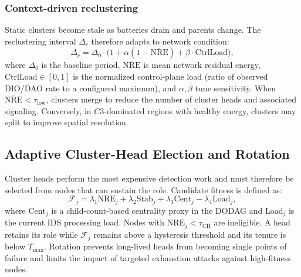 \subsubsection{Context-driven reclustering}
Static clusters become stale as batteries drain and parents change.
The reclustering interval $\Delta_c$ therefore adapts to network condition:
\begin{equation}
\label{eq:recluster}
\Delta_c = \Delta_0 \cdot \bigl(1 + \alpha(1-\overline{\mathrm{NRE}}) + \beta \cdot \mathrm{CtrlLoad}\bigr),
\end{equation}
where $\Delta_0$ is the baseline period, $\overline{\mathrm{NRE}}$ is mean network residual energy, $\mathrm{CtrlLoad} \in [0,1]$ is the normalized control-plane load (ratio of observed DIO/DAO rate to a configured maximum), and $\alpha,\beta$ tune sensitivity.
When $\overline{\mathrm{NRE}} < \tau_{\mathrm{low}}$, clusters merge to reduce the number of cluster heads and associated signaling.
Conversely, in $C3$-dominated regions with healthy energy, clusters may split to improve spatial resolution.

\subsection{Adaptive Cluster-Head Election and Rotation}
Cluster heads perform the most expensive detection work and must therefore be selected from nodes that can sustain the role.
Candidate fitness is defined as:
\begin{equation}
\label{eq:chfit}
\mathcal{F}_j = \lambda_1 \mathrm{NRE}_j + \lambda_2 \mathrm{Stab}_j + \lambda_3 \mathrm{Cent}_j - \lambda_4 \mathrm{Load}_j,
\end{equation}
where $\mathrm{Cent}_j$ is a child-count-based centrality proxy in the DODAG and $\mathrm{Load}_j$ is the current IDS processing load.
Nodes with $\mathrm{NRE}_j < \tau_{\mathrm{CH}}$ are ineligible.
A head retains its role while $\mathcal{F}_j$ remains above a hysteresis threshold and its tenure is below $T_{\max}$.
Rotation prevents long-lived heads from becoming single points of failure and limits the impact of targeted exhaustion attacks against high-fitness nodes.

